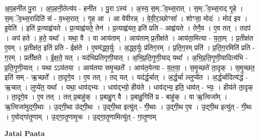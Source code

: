 \documentclass[17pt]{extarticle}
\begin{document}
अ॒प॒हनी॑त पु॒रा । अ॒प॒हनी॒तेत्य॑प - हनी॑त । पु॒रा ऽस्य॑ । अ॒स्य॒ स॒म्ॅव॒थ्स॒रात् । स॒म्ॅव॒थ्स॒राद् गृ॒हे । स॒म्ॅव॒थ्स॒रादिति॑ सं - व॒थ्स॒रात् । गृ॒ह आ । आ वे॑वीरन्न् । वे॒वी॒र॒ञ्छोꣳसा᳚ । शोꣳसा॒ मोदः॑ । मोद॑ इव । इ॒वेति॑ । इति॑ प्र॒त्याह्व॑यते । प्र॒त्याह्व॑यते॒ तेन॑ । प्र॒त्याह्व॑यत॒ इति॑ प्रति - आह्व॑यते । तेनै॒व । ए॒व तत् । तदप॑ । अप॑ हते । ह॒ते॒ यथा᳚ । यथा॒ वै । वा आय॑ताम् । आय॑ताम् प्र॒तीक्ष॑ते । आय॑ता॒मित्या - य॒ता॒म् । प्र॒तीक्ष॑त ए॒वम् । प्र॒तीक्ष॑त॒ इति॑ प्रति - ईक्ष॑ते । ए॒वम॑द्ध्व॒र्युः । अ॒द्ध्व॒र्युः प्र॑तिग॒रम् । प्र॒ति॒ग॒रम् प्रति॑ । प्र॒ति॒ग॒रमिति॑ प्रति - ग॒रम् । प्रती᳚क्षते । ई॒क्ष॒ते॒ यत् । यद॑भिप्रतिगृणी॒यात् । अ॒भि॒प्र॒ति॒गृ॒णी॒याद् यथा᳚ । अ॒भि॒प्र॒ति॒गृ॒णी॒यादित्य॑भि - प्र॒ति॒गृ॒णी॒यात् । यथा ऽऽय॑तया । आय॑तया समृ॒च्छते᳚ । आय॑त॒येत्या - य॒त॒या॒ । स॒मृ॒च्छते॑ ता॒दृक् । स॒मृ॒च्छत॒ इति॑ सम् - ऋ॒च्छते᳚ । ता॒दृगे॒व । ए॒व तत् । तद् यत् । यद॑र्द्ध॒र्चात् । अ॒र्द्ध॒र्चा ल्लुप्ये॑त । अ॒र्द्ध॒र्चादित्य॑र्द्ध - ऋ॒चात् । लुप्ये॑त॒ यथा᳚ । यथा॒ धाव॑द्भ्यः । धाव॑द्भ्यो॒ हीय॑ते । धाव॑द्भ्य॒ इति॒ धाव॑त् - भ्यः॒ । हीय॑ते ता॒दृक् । ता॒दृगे॒व । ए॒व तत् । तत् प्र॒बाहु॑क् । प्र॒बाहु॒ग् वै । प्र॒बाहु॒गिति॑ प्र - बाहु॑क् । वा ऋ॒त्विजा᳚म् । ऋ॒त्विजा॑मुद्गी॒थाः । उ॒द्गी॒था उ॑द्गी॒थः । उ॒द्गी॒था इत्यु॑त् - गी॒थाः । उ॒द्गी॒थ ए॒व । उ॒द्गी॒थ इत्यु॑त् - गी॒थः । ए॒वोद्गा॑तृ॒णाम् । उ॒द्गा॒तृ॒णामृ॒चः । उ॒द्गा॒तृ॒णामित्यु॑त् - गा॒तृ॒णाम् \newline

\textbf{Jatai Paata} \newline
\end{document}
